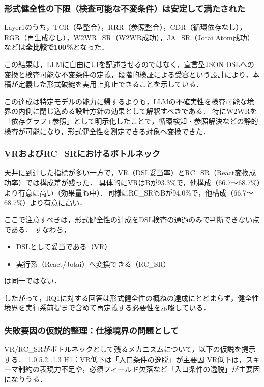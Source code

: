 \documentclass[a4paper,10pt]{jarticle}
\makeatletter
\newcommand{\subsubsubsection}{\@startsection{paragraph}{4}{\z@}%
{1.0\Cvs \@plus.5\Cdp \@minus.2\Cdp}%
{.1\Cvs \@plus.3\Cdp}%
{\reset@font\sffamily\normalsize}
}
\makeatother
\begin{document}
\subsubsection{形式健全性の下限（検査可能な不変条件）は安定して満たされた}
\label{subsubsec:disc_rq1_baseline}

Layer1のうち，TCR（型整合），RRR（参照整合），CDR（循環依存なし），RGR（再生成なし），W2WR\_SR（W2WR成功），JA\_SR（Jotai Atom成功）などは\textbf{全比較で100\%}となった．

この結果は，LLMに自由にUIを記述させるのではなく，宣言型JSON DSLへの変換と検査可能な不変条件の定義，段階的検証による受容という設計により，本稿が定義した形式破綻を実用上抑止できることを示している．

この達成は特定モデルの能力に帰するよりも，LLMの不確実性を検査可能な境界の内側に閉じ込める設計方針の効果として解釈すべきである．
特にW2WRを「依存グラフ+参照」として明示化したことで，循環検知・参照解決などの静的検査が可能になり，形式健全性を測定できる対象へ変換できた．

\subsubsection{VRおよびRC\_SRにおけるボトルネック}
\label{subsubsec:disc_rq1_bottleneck}

天井に到達した指標が多い一方で，VR（DSL妥当率）とRC\_SR（React変換成功率）では構成差が残った．
具体的にVRはBが93.3\%で，他構成（66.7〜68.7\%）より有意に高い（効果量も中）．同様にRC\_SRもBが94.0\%で，他構成（66.7〜68.7\%）より有意に高い．

ここで注意すべきは，形式健全性の達成をDSL検査の通過のみで判断できない点である．
すなわち，
\begin{itemize}
\item[(A)] DSLとして妥当である（VR）
\item[(B)] 実行系（React/Jotai）へ変換できる（RC\_SR）
\end{itemize}
は同一ではない．

したがって，RQ1に対する回答は形式健全性の概ねの達成にとどまらず，健全性境界を実行系前提まで含めて再定義する必要性を示唆している．

\subsubsection{失敗要因の仮説的整理：仕様境界の問題として}
\label{subsubsec:disc_rq1_hypothesis}

VR/RC\_SRがボトルネックとして残るメカニズムについて，以下の仮説を提示する．
\subsubsubsection{H1：VR低下は「入口条件の逸脱」が主要因}
VR低下は，スキーマ制約の表現力不足や，必須フィールド欠落など「入口条件の逸脱」が主要因になりうる．
\end{document}
